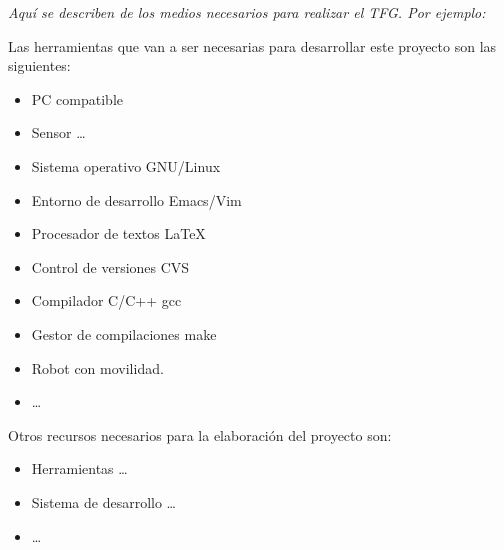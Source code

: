 \documentclass[11pt,a4paper,oneside]{article}
\begin{document}
\textit{Aquí se describen de los medios necesarios para realizar el TFG. Por
  ejemplo:}

Las herramientas que van a ser necesarias para desarrollar este proyecto
son las siguientes:

\begin{itemize}
\item PC compatible
\item Sensor  \ldots
\item Sistema operativo GNU/Linux~\cite{gnulinux}
\item Entorno de desarrollo Emacs/Vim~\cite{emacs}
\item Procesador de textos \LaTeX~\cite{lamport94}
\item Control de versiones CVS~\cite{cvs}
\item Compilador C/C++ gcc~\cite{gcc}
\item Gestor de compilaciones make~\cite{make}
\item Robot con movilidad.
\item  \ldots
\end{itemize}



Otros recursos necesarios para la elaboración del proyecto son:

\begin{itemize}
\item Herramientas  \ldots
\item Sistema de desarrollo  \ldots
\item  \ldots
\end{itemize}




% 


\end{document}
